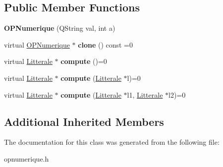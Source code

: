 \subsection*{Public Member Functions}
\begin{DoxyCompactItemize}
\item 
{\bfseries O\+P\+Numerique} (Q\+String val, int a)\hypertarget{class_o_p_numerique_ae4edc185c642b986930dc3af3632100b}{}\label{class_o_p_numerique_ae4edc185c642b986930dc3af3632100b}

\item 
virtual \hyperlink{class_o_p_numerique}{O\+P\+Numerique} $\ast$ {\bfseries clone} () const  =0\hypertarget{class_o_p_numerique_a6cd9e71c2dcd91fc0116203918795575}{}\label{class_o_p_numerique_a6cd9e71c2dcd91fc0116203918795575}

\item 
virtual \hyperlink{class_litterale}{Litterale} $\ast$ {\bfseries compute} ()=0\hypertarget{class_o_p_numerique_a7ea5720f3721cf682912b17fd24f7505}{}\label{class_o_p_numerique_a7ea5720f3721cf682912b17fd24f7505}

\item 
virtual \hyperlink{class_litterale}{Litterale} $\ast$ {\bfseries compute} (\hyperlink{class_litterale}{Litterale} $\ast$l)=0\hypertarget{class_o_p_numerique_a38cf8b1a677cef5c9040b4f9a7351ade}{}\label{class_o_p_numerique_a38cf8b1a677cef5c9040b4f9a7351ade}

\item 
virtual \hyperlink{class_litterale}{Litterale} $\ast$ {\bfseries compute} (\hyperlink{class_litterale}{Litterale} $\ast$l1, \hyperlink{class_litterale}{Litterale} $\ast$l2)=0\hypertarget{class_o_p_numerique_a783635d833da49584cf5a7192a732284}{}\label{class_o_p_numerique_a783635d833da49584cf5a7192a732284}

\end{DoxyCompactItemize}
\subsection*{Additional Inherited Members}


The documentation for this class was generated from the following file\+:\begin{DoxyCompactItemize}
\item 
opnumerique.\+h\end{DoxyCompactItemize}
